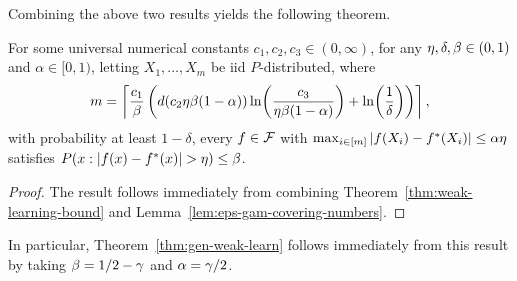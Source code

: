 Combining the above two results yields the following theorem.

\begin{theorem}
\label{thm:eps-gam-weak-sample-complexity}
For some universal numerical constants $c_{1},c_{2},c_{3} \in (0,\infty)$, 
for any $\eta,\delta,\beta \in (0,1)$ and $\alpha \in [0,1)$, %
letting $X_{1},\ldots,X_{m}$ be iid $P$-distributed, where 
\begin{equation*}
m = \left\lceil \frac{c_{1}}{\beta} \left(  d(c_{2} \dev \beta (1-\alpha)) \ln\!\left( \frac{c_{3}}{\dev \beta (1-\alpha)} \right) + \ln\!\left(\frac{1}{\delta}\right) \right) \right\rceil, %
\end{equation*}
with probability at least $1-\delta$, every $f \in \mathcal{F}$ with $\max_{i \in [m]} |f(X_{i}) - f^{*}(X_{i})| \leq \alpha \eta$
satisfies $P( x : | f(x) - f^{*}(x) | > \eta ) \leq \beta$.
\end{theorem}
\begin{proof}
The result follows immediately from combining Theorem~\ref{thm:weak-learning-bound} and Lemma~\ref{lem:eps-gam-covering-numbers}.
\end{proof}

In particular, Theorem~\ref{thm:gen-weak-learn} follows immediately from this result by taking $\beta = 1/2 - \gamma$ and $\alpha = \gamma/2$.

